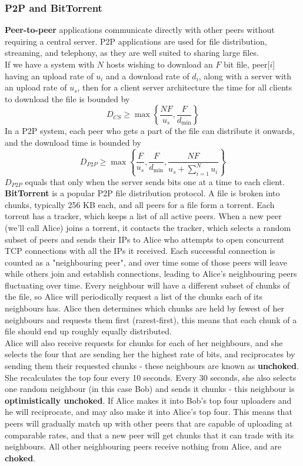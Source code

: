 \subsubsection{P2P and BitTorrent}
\textbf{Peer-to-peer} applications communicate directly with other peers without requiring a central server. P2P applications are used for file distribution, streaming, and telephony, as they are well suited to sharing large files.\\
If we have a system with $N$ hosts wishing to download an $F$ bit file, peer[$i$] having an upload rate of $u_i$ and a download rate of $d_i$, along with a server with an upload rate of $u_s$, then for a client server architecture the time for all clients to download the file is bounded by
$$
	D_{CS}\ge\max\left\{\frac{NF}{u_s},\frac{F}{d_{\min}}\right\}
$$
In a P2P system, each peer who gets a part of the file can distribute it onwards, and the download time is bounded by
$$
	D_{P2P}\ge\max\left\{\frac{F}{u_s},\frac{F}{d_{\min}},\frac{NF}{u_s+\sum^N_{i=1}u_i}\right\}
$$
$D_{P2P}$ equals that only when the server sends bits one at a time to each client.\\
\textbf{BitTorrent} is a popular P2P file distribution protocol. A file is broken into chunks, typically 256 KB each, and all peers for a file form a torrent. Each torrent has a tracker, which keeps a list of all active peers. When a new peer (we'll call Alice) joins a torrent, it contacts the tracker, which selects a random subset of peers and sends their IPs to Alice who attempts to open concurrent TCP connections with all the IPs it received. Each successful connection is counted as a "neighbouring peer", and over time some of those peers will leave while others join and establish connections, leading to Alice's neighbouring peers fluctuating over time. Every neighbour will have a different subset of chunks of the file, so Alice will periodically request a list of the chunks each of its neighbours has. Alice then determines which chunks are held by fewest of her neighbours and requests them first (rarest-first), this means that each chunk of a file should end up roughly equally distributed.\\
Alice will also receive requests for chunks for each of her neighbours, and she selects the four that are sending her the highest rate of bits, and reciprocates by sending them their requested chunks - these neighbours are known as \textbf{unchoked}. She recalculates the top four every 10 seconds. Every 30 seconds, she also selects one random neighbour (in this case Bob) and sends it chunks - this neighbour is \textbf{optimistically unchoked}. If Alice makes it into Bob's top four uploaders and he will reciprocate, and may also make it into Alice's top four. This means that peers will gradually match up with other peers that are capable of uploading at comparable rates, and that a new peer will get chunks that it can trade with its neighbours. All other neighbouring peers receive nothing from Alice, and are \textbf{choked}.

